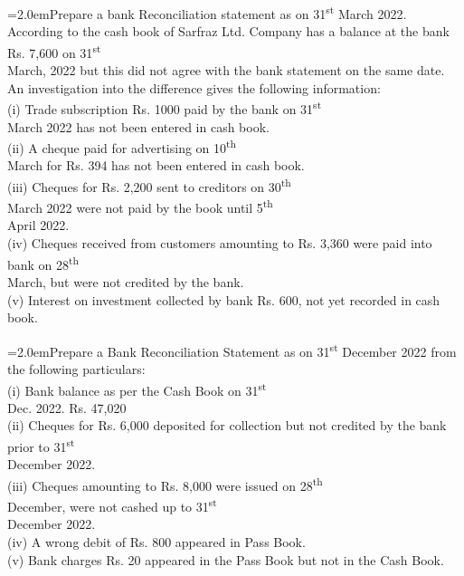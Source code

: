 \documentclass[11pt,a4paper]{article}
\newcommand{\lqn}[2]{\Needspace{6\baselineskip}\par\medskip\noindent\hangindent=2.0em\hangafter=1\makebox[2.0em][l]{\textbf{#1.}}#2\par}
\begin{document}
\lqn{67}{Prepare a bank Reconciliation statement as on 31\textsuperscript{st} March 2022. According to the cash book of Sarfraz Ltd. Company has a balance at the bank Rs. 7,600 on 31\textsuperscript{st}\\
March, 2022 but this did not agree with the bank statement on the same date. An investigation into the difference gives the following information:\\
(i) Trade subscription Rs. 1000 paid by the bank on 31\textsuperscript{st}\\
March 2022 has not been entered in cash book.\\
(ii) A cheque paid for advertising on 10\textsuperscript{th}\\
March for Rs. 394 has not been entered in cash book.\\
(iii) Cheques for Rs. 2,200 sent to creditors on 30\textsuperscript{th}\\
March 2022 were not paid by the book until 5\textsuperscript{th}\\
April 2022.\\
(iv) Cheques received from customers amounting to Rs. 3,360 were paid into bank on 28\textsuperscript{th}\\
March, but were not credited by the bank.\\
(v) Interest on investment collected by bank Rs. 600, not yet recorded in cash book.\par
}
\lqn{68}{Prepare a Bank Reconciliation Statement as on 31\textsuperscript{st} December 2022 from the following particulars:\\
(i) Bank balance as per the Cash Book on 31\textsuperscript{st}\\
Dec. 2022. Rs. 47,020\\
(ii) Cheques for Rs. 6,000 deposited for collection but not credited by the bank prior to 31\textsuperscript{st}\\
December 2022.\\
(iii) Cheques amounting to Rs. 8,000 were issued on 28\textsuperscript{th}\\
December, were not cashed up to 31\textsuperscript{st}\\
December 2022.\\
(iv) A wrong debit of Rs. 800 appeared in Pass Book.\\
(v) Bank charges Rs. 20 appeared in the Pass Book but not in the Cash Book.\par
}
\end{document}
